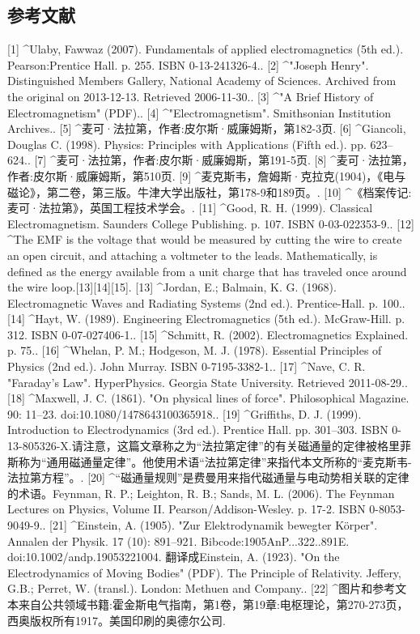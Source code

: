 \subsection{参考文献}
[1]
^Ulaby, Fawwaz (2007). Fundamentals of applied electromagnetics (5th ed.). Pearson:Prentice Hall. p. 255. ISBN 0-13-241326-4..
[2]
^"Joseph Henry". Distinguished Members Gallery, National Academy of Sciences. Archived from the original on 2013-12-13. Retrieved 2006-11-30..
[3]
^"A Brief History of Electromagnetism" (PDF)..
[4]
^"Electromagnetism". Smithsonian Institution Archives..
[5]
^麦可·法拉第，作者:皮尔斯·威廉姆斯，第182-3页.
[6]
^Giancoli, Douglas C. (1998). Physics: Principles with Applications (Fifth ed.). pp. 623–624..
[7]
^麦可·法拉第，作者:皮尔斯·威廉姆斯，第191-5页.
[8]
^麦可·法拉第，作者:皮尔斯·威廉姆斯，第510页.
[9]
^麦克斯韦，詹姆斯·克拉克(1904)，《电与磁论》，第二卷，第三版。牛津大学出版社，第178-9和189页。.
[10]
^《档案传记:麦可·法拉第》，英国工程技术学会。.
[11]
^Good, R. H. (1999). Classical Electromagnetism. Saunders College Publishing. p. 107. ISBN 0-03-022353-9..
[12]
^The EMF is the voltage that would be measured by cutting the wire to create an open circuit, and attaching a voltmeter to the leads. Mathematically, is defined as the energy available from a unit charge that has traveled once around the wire loop.[13][14][15].
[13]
^Jordan, E.; Balmain, K. G. (1968). Electromagnetic Waves and Radiating Systems (2nd ed.). Prentice-Hall. p. 100..
[14]
^Hayt, W. (1989). Engineering Electromagnetics (5th ed.). McGraw-Hill. p. 312. ISBN 0-07-027406-1..
[15]
^Schmitt, R. (2002). Electromagnetics Explained. p. 75..
[16]
^Whelan, P. M.; Hodgeson, M. J. (1978). Essential Principles of Physics (2nd ed.). John Murray. ISBN 0-7195-3382-1..
[17]
^Nave, C. R. "Faraday's Law". HyperPhysics. Georgia State University. Retrieved 2011-08-29..
[18]
^Maxwell, J. C. (1861). "On physical lines of force". Philosophical Magazine. 90: 11–23. doi:10.1080/1478643100365918..
[19]
^Griffiths, D. J. (1999). Introduction to Electrodynamics (3rd ed.). Prentice Hall. pp. 301–303. ISBN 0-13-805326-X.请注意，这篇文章称之为“法拉第定律”的有关磁通量的定律被格里菲斯称为“通用磁通量定律”。他使用术语“法拉第定律”来指代本文所称的“麦克斯韦-法拉第方程”。.
[20]
^“磁通量规则”是费曼用来指代磁通量与电动势相关联的定律的术语。Feynman, R. P.; Leighton, R. B.; Sands, M. L. (2006). The Feynman Lectures on Physics, Volume II. Pearson/Addison-Wesley. p. 17-2. ISBN 0-8053-9049-9..
[21]
^Einstein, A. (1905). "Zur Elektrodynamik bewegter Körper". Annalen der Physik. 17 (10): 891–921. Bibcode:1905AnP...322..891E. doi:10.1002/andp.19053221004. 翻译成Einstein, A. (1923). "On the Electrodynamics of Moving Bodies" (PDF). The Principle of Relativity. Jeffery, G.B.; Perret, W. (transl.). London: Methuen and Company..
[22]
^图片和参考文本来自公共领域书籍:霍金斯电气指南，第1卷，第19章:电枢理论，第270-273页，西奥版权所有1917。美国印刷的奥德尔公司.